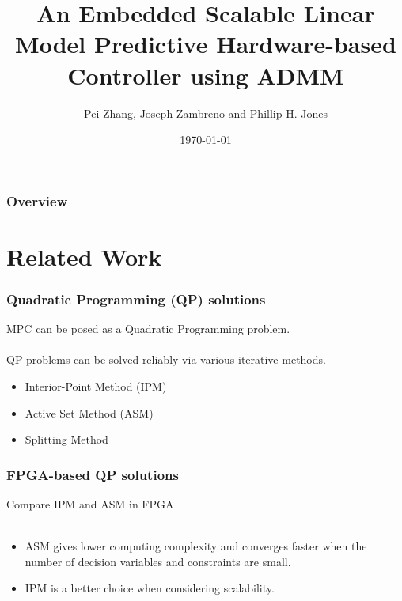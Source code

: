 \documentclass{beamer}
\title[ADMM FPGA]{An Embedded Scalable Linear Model Predictive Hardware-based Controller using ADMM} %
\author{Pei Zhang, Joseph Zambreno and Phillip H. Jones} %
\institute[ISU] %
{
\textit{Presenter: Pei Zhang}\\
\medskip
Iowa State University\\ %
\medskip

\textit{peizhang@iastate.edu} %
}
\date{\today} %
\begin{document}
\begin{frame}
\titlepage %
\end{frame}

\begin{frame}
\frametitle{Overview} %
\tableofcontents %
\end{frame}


\section{Related Work}
\begin{frame}
\frametitle{Quadratic Programming (QP) solutions}

MPC can be posed as a Quadratic Programming problem.\\~\\

QP problems can be solved reliably via various iterative methods.
\begin{itemize}
\item Interior-Point Method (IPM)
\item Active Set Method (ASM)
\item Splitting Method
\end{itemize}

\end{frame}

\begin{frame}
\frametitle{FPGA-based QP solutions}
Compare IPM and ASM in FPGA\\~\\
\begin{itemize}
\item ASM gives lower computing complexity and converges faster when the number of decision variables and constraints are small.
\item IPM is a better choice when considering scalability.
\end{itemize}
\end{frame}
\end{document}
